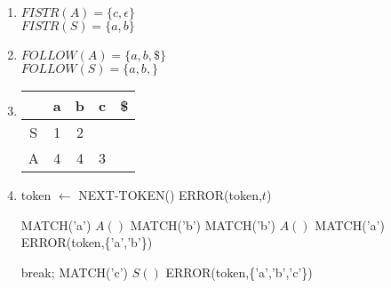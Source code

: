 \documentclass[a4paper, justified]{tufte-handout}
\begin{document}
\begin{solution}

\begin{enumerate}[(1)]
    
  \item 
    $FISTR(A) = \{c,\epsilon\}$\\
    $FISTR(S) = \{a,b\}$
  \item 
    $FOLLOW(A) = \{a,b,\$\}$\\
    $FOLLOW(S) = \{a,b,\}$
  \item 
    \begin{tabular}{|c|c|c|c|c|}%
    \hline  %
    \ &a&b&c&\$\\
    \hline  %
    S&1&2&\ &\ \\
    \hline %
    A&4&4&3&\ \\
    \hline %
    \end{tabular}
  \item 
  \begin{algorithm}
    \begin{algorithmic}[1]
          \State token $\gets$ NEXT-TOKEN()
          \State ERROR(token,$t$)
        \EndIf
      \EndProcedure
    \end{algorithmic}
  \end{algorithm}
  \begin{algorithm}
    \begin{algorithmic}[1]
          \State MATCH('a')
          \State $A()$
          \State MATCH('b')
          \State MATCH('b')
          \State $A()$
          \State MATCH('a')
        \Else
          \State ERROR(token,\{'a','b'\})
        \EndIf
      \EndProcedure
    \end{algorithmic}
  \end{algorithm}
  \begin{algorithm}
    \begin{algorithmic}[1]
          \State break;
          \State MATCH('c')
          \State $S()$
        \Else
          \State ERROR(token,\{'a','b','c'\})
        \EndIf
      \EndProcedure
    \end{algorithmic}
  \end{algorithm}
\end{enumerate}

\end{solution}




\end{document}
